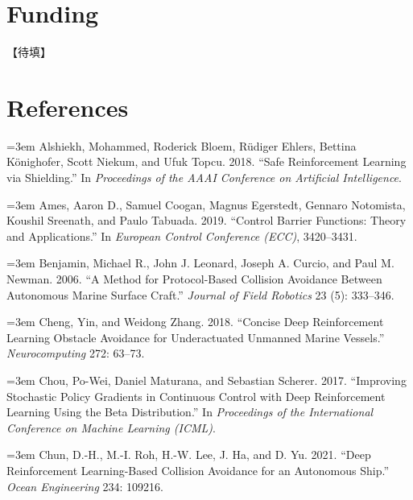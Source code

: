 \documentclass[12pt,letterpaper]{article}
\newcommand{\refitem}[1]{\par\begingroup\emergencystretch=3em\sloppy\noindent\hangindent=0.5in\hangafter=1 #1\par\endgroup}
\newcommand{\TBD}{【待填】}
\begin{document}
\section*{Funding}
\TBD

\section*{References}

\refitem{\hypertarget{ref:alshiekh2018}{}Alshiekh, Mohammed, Roderick Bloem, Rüdiger Ehlers, Bettina Könighofer, Scott Niekum, and Ufuk Topcu. 2018. ``Safe Reinforcement Learning via Shielding.'' In \textit{Proceedings of the AAAI Conference on Artificial Intelligence}.}

\refitem{\hypertarget{ref:ames2019}{}Ames, Aaron D., Samuel Coogan, Magnus Egerstedt, Gennaro Notomista, Koushil Sreenath, and Paulo Tabuada. 2019. ``Control Barrier Functions: Theory and Applications.'' In \textit{European Control Conference (ECC)}, 3420--3431.}

\refitem{\hypertarget{ref:benjamin2006}{}Benjamin, Michael R., John J. Leonard, Joseph A. Curcio, and Paul M. Newman. 2006. ``A Method for Protocol-Based Collision Avoidance Between Autonomous Marine Surface Craft.'' \textit{Journal of Field Robotics} 23 (5): 333--346.}

\refitem{\hypertarget{ref:cheng2018}{}Cheng, Yin, and Weidong Zhang. 2018. ``Concise Deep Reinforcement Learning Obstacle Avoidance for Underactuated Unmanned Marine Vessels.'' \textit{Neurocomputing} 272: 63--73.}

\refitem{\hypertarget{ref:chou2017}{}Chou, Po-Wei, Daniel Maturana, and Sebastian Scherer. 2017. ``Improving Stochastic Policy Gradients in Continuous Control with Deep Reinforcement Learning Using the Beta Distribution.'' In \textit{Proceedings of the International Conference on Machine Learning (ICML)}.}

\refitem{\hypertarget{ref:chun2021}{}Chun, D.-H., M.-I. Roh, H.-W. Lee, J. Ha, and D. Yu. 2021. ``Deep Reinforcement Learning-Based Collision Avoidance for an Autonomous Ship.'' \textit{Ocean Engineering} 234: 109216.}
\end{document}
